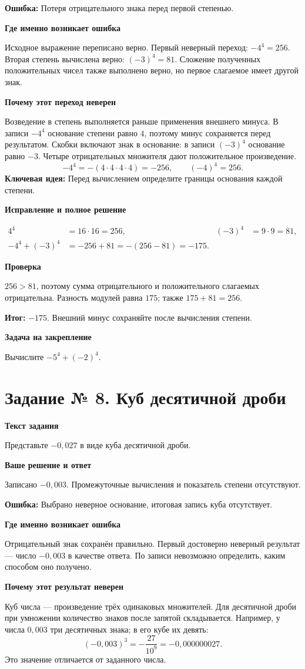 \documentclass[a4paper,12pt]{article}
\newcommand{\err}[1]{\textcolor{red!75!black}{\textbf{Ошибка:}} #1}
\newcommand{\idea}[1]{\textcolor{blue!60!black}{\textbf{Ключевая идея:}} #1}
\newcommand{\result}[1]{\textcolor{darkaccent}{\textbf{Итог:}} #1}
\newcommand{\parthead}[1]{\par\medskip\textbf{#1}\par}
\begin{document}
\err{Потеря отрицательного знака перед первой степенью.}

\parthead{Где именно возникает ошибка}
Исходное выражение переписано верно. Первый неверный переход: $-4^4=256$. Вторая степень вычислена верно: $(-3)^4=81$. Сложение полученных положительных чисел также выполнено верно, но первое слагаемое имеет другой знак.

\parthead{Почему этот переход неверен}
Возведение в степень выполняется раньше применения внешнего минуса. В записи $-4^4$ основание степени равно $4$, поэтому минус сохраняется перед результатом. Скобки включают знак в основание: в записи $(-3)^4$ основание равно $-3$. Четыре отрицательных множителя дают положительное произведение.
\[
-4^4=-(4\cdot4\cdot4\cdot4)=-256,\qquad
(-4)^4=256.
\]
\idea{Перед вычислением определите границы основания каждой степени.}

\parthead{Исправление и полное решение}
\begin{align*}
4^4&=16\cdot16=256, & (-3)^4&=9\cdot9=81,\\
-4^4+(-3)^4&=-256+81=-(256-81)=-175.
\end{align*}
\parthead{Проверка}
$256>81$, поэтому сумма отрицательного и положительного слагаемых отрицательна. Разность модулей равна $175$; также $175+81=256$.

\result{$\boxed{-175}$. Внешний минус сохраняйте после вычисления степени.}
\parthead{Задача на закрепление}
Вычислите $-5^4+(-2)^4$.
\clearpage
{}\label{task:8}
\section*{\color{darkaccent} Задание № 8. Куб десятичной дроби}
\parthead{Текст задания}
Представьте $-0{,}027$ в виде куба десятичной дроби.
\parthead{Ваше решение и ответ}
Записано $-0{,}003$. Промежуточные вычисления и показатель степени отсутствуют.

\err{Выбрано неверное основание, итоговая запись куба отсутствует.}

\parthead{Где именно возникает ошибка}
Отрицательный знак сохранён правильно. Первый достоверно неверный результат --- число $-0{,}003$ в качестве ответа. По записи невозможно определить, каким способом оно получено.

\parthead{Почему этот результат неверен}
Куб числа --- произведение трёх одинаковых множителей. Для десятичной дроби при умножении количество знаков после запятой складывается. Например, у числа $0{,}003$ три десятичных знака; в его кубе их девять:
\[(-0{,}003)^3=-\frac{27}{10^9}=-0{,}000000027.\]
Это значение отличается от заданного числа.
\end{document}
